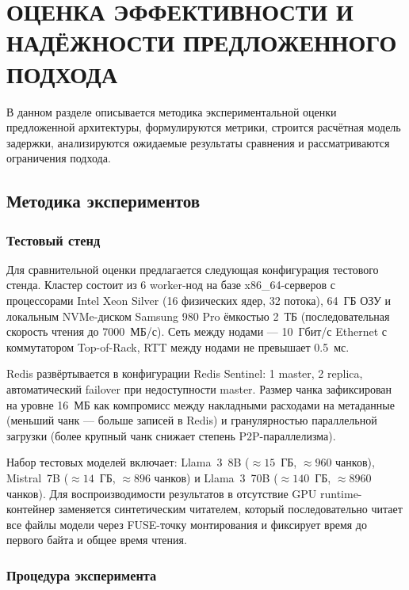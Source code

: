 \chapter{ОЦЕНКА ЭФФЕКТИВНОСТИ И НАДЁЖНОСТИ ПРЕДЛОЖЕННОГО ПОДХОДА}

В данном разделе описывается методика экспериментальной оценки предложенной архитектуры, формулируются метрики, строится расчётная модель задержки, анализируются ожидаемые результаты сравнения и рассматриваются ограничения подхода.

\section{Методика экспериментов}

\subsection*{Тестовый стенд}

Для сравнительной оценки предлагается следующая конфигурация тестового стенда. Кластер состоит из 6 worker-нод на базе x86\_64-серверов с процессорами Intel Xeon Silver (16 физических ядер, 32 потока), 64~ГБ ОЗУ и локальным NVMe-диском Samsung 980 Pro ёмкостью 2~ТБ (последовательная скорость чтения до 7000~МБ/с). Сеть между нодами --- 10~Гбит/с Ethernet с коммутатором Top-of-Rack, RTT между нодами не превышает 0.5~мс.

Redis развёртывается в конфигурации Redis Sentinel: 1 master, 2 replica, автоматический failover при недоступности master. Размер чанка зафиксирован на уровне 16~МБ как компромисс между накладными расходами на метаданные (меньший чанк --- больше записей в Redis) и гранулярностью параллельной загрузки (более крупный чанк снижает степень P2P-параллелизма).

Набор тестовых моделей включает: Llama~3~8B ($\approx 15$~ГБ, $\approx 960$ чанков), Mistral~7B ($\approx 14$~ГБ, $\approx 896$ чанков) и Llama~3~70B ($\approx 140$~ГБ, $\approx 8960$ чанков). Для воспроизводимости результатов в отсутствие GPU runtime-контейнер заменяется синтетическим читателем, который последовательно читает все файлы модели через FUSE-точку монтирования и фиксирует время до первого байта и общее время чтения.

\subsection*{Процедура эксперимента}

